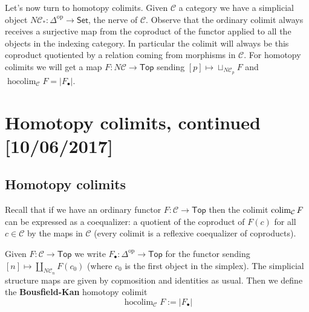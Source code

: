 \documentclass{amsart}
\DeclareMathOperator{\hocolim}{hocolim}
\begin{document}
Let's now turn to homotopy colimits. Given $\mathcal{C}$ a category we have a simplicial
object $N\mathcal{C}_*:\Delta^\text{op}\to\mathsf{Set}$, the nerve of $\mathcal{C}$.
Observe that the ordinary colimit always receives a surjective map from the coproduct
of the functor applied to all the objects in the indexing category. In particular the
colimit will always be this coproduct quotiented by a relation coming from morphisms
in $\mathcal{C}$.
For homotopy colimits we will get a map $F:N\mathcal{C}\to \mathsf{Top}$ sending
$[p]\mapsto\sqcup_{N\mathcal{C}_p}F$ and $\hocolim_{\mathcal{C}} F = |F_\bullet|$.

\newpage

\section{Homotopy colimits, continued [10/06/2017]}

\subsection{Homotopy colimits}

Recall that if we have an ordinary functor $F:\mathcal{C}\to \mathsf{Top}$ then
the colimit $\operatorname*{colim}_\mathcal{C} F$ can be expressed as a coequalizer: a quotient
of the coproduct of $F(c)$ for all $c\in \mathcal{C}$ by the maps in $\mathcal{C}$
(every colimit is a reflexive coequalizer of coproducts).

\begin{definition}
    Given $F:\mathcal{C}\to \mathsf{Top}$ we write $F_\bullet:\Delta^\text{op} \to \mathsf{Top}$
    for the functor sending $[n]\mapsto \coprod_{N\mathcal{C}_n} F(c_0)$ (where $c_0$ is the
    first object in the simplex). The simplicial structure maps are given by copmosition and
    identities as usual. Then we define the \textbf{Bousfield-Kan} homotopy colimit
    \begin{equation*}
        \hocolim_{\mathcal{C}} F := |F_\bullet|
    \end{equation*}
\end{definition}
\end{document}

